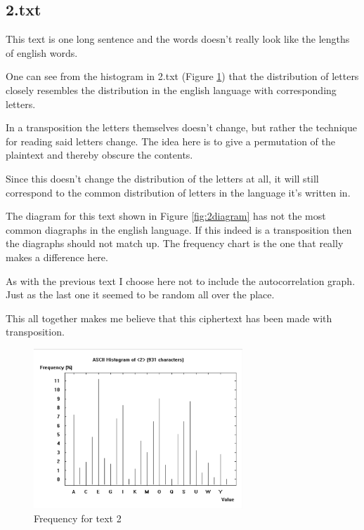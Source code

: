 \newpage
\subsection*{2.txt}

This text is one long sentence and the words doesn't really look like the lengths of english words.

One can see from the histogram in 2.txt (Figure \ref{fig:2freq}) that the distribution of letters closely resembles the distribution in the english language with corresponding letters.

In a transposition the letters themselves doesn't change, but rather the technique for reading said letters change.
The idea here is to give a permutation of the plaintext and thereby obscure the contents.

Since this doesn't change the distribution of the letters at all, it will still correspond to the common distribution of letters in the language it's written in.

The diagram for this text shown in Figure \ref{fig:2diagram} has not the most common diagraphs in the english language\cite{diagraphs}.
If this indeed is a transposition then the diagraphs should not match up.
The frequency chart is the one that really makes a difference here.

As with the previous text I choose here not to include the autocorrelation graph.
Just as the last one it seemed to be random all over the place.

This all together makes me believe that this ciphertext has been made with transposition.

\begin{figure}[ht!]
    \begin{center}
        \includegraphics[width=0.7\textwidth]{assets/2_frequency.png}
        \caption{Frequency for text 2}
        \label{fig:2freq}
    \end{center}
\end{figure}

